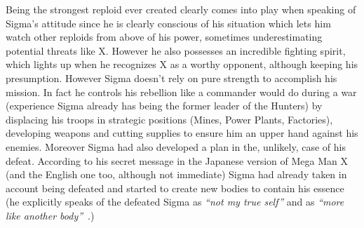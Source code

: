 Being the strongest reploid ever created clearly comes into play when speaking of Sigma's attitude since he is clearly conscious of his situation which lets him watch other reploids from above of his power, sometimes underestimating potential threats like X. However he also possesses an incredible fighting spirit, which lights up when he recognizes X as a worthy opponent, although keeping his presumption. However Sigma doesn't rely on pure strength to accomplish his mission. In fact he controls his rebellion like a commander would do during a war (experience Sigma already has being the former leader of the Hunters) by displacing his troops in strategic positions (Mines, Power Plants, Factories), developing weapons and cutting supplies to ensure him an upper hand against his enemies. Moreover Sigma had also developed a plan in the, unlikely, case of his defeat. According to his secret message in the Japanese version of Mega Man X (and the English one too, although not immediate) Sigma had already taken in account being defeated and started to create new bodies to contain his essence (he explicitly speaks of the defeated Sigma as \textit{``not my true self''} and as \textit{``more like another body''}~\cite{wordpress:X_japanese_script}.)

